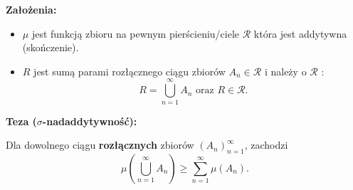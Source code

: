 \begin{theorem}
	\textbf{Założenia:}
	\begin{itemize}
		\item $\mu$ jest funkcją zbioru na pewnym pierścieniu/ciele $\mathcal{R}$ która jest addytywna (skończenie).
		\item $R $ jest sumą parami rozłącznego ciągu zbiorów $A_{n}\in \mathcal{R}$ i należy o $\mathcal{R}$ :
			 \[
			R = \bigcup_{n=1} ^{\infty}A_{n} \text{ oraz } R \in \mathcal{R}
			.\] 
	\end{itemize}

	\textbf{Teza ($\sigma$-nadaddytywność):} 

	Dla dowolnego ciągu \textbf{rozłącznych} zbiorów $\left( A_{n} \right)_{n=1}^{\infty}$, zachodzi
	\[
	\mu\left( \bigcup_{n=1} ^{\infty}A_{n} \right) \ge \sum_{n = 1}^{\infty} \mu\left( A_{n} \right) 
	.\] 
\end{theorem} 
